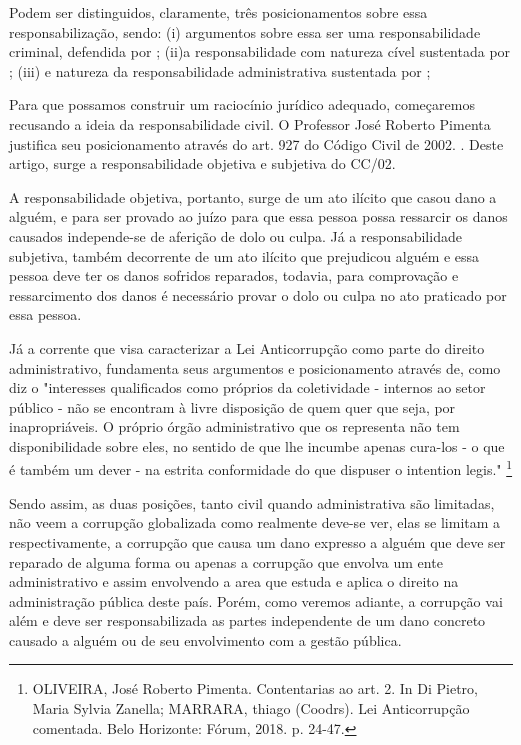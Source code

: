 Podem ser distinguidos, claramente, três posicionamentos sobre essa responsabilização, sendo: (i) argumentos sobre essa ser uma responsabilidade criminal, defendida por \cite{modestocarvalhosa}; (ii)a responsabilidade com natureza cível sustentada por \cite{JosePimenta}; (iii) e natureza da responsabilidade administrativa sustentada por \cite{MariaSylvia};  

Para que possamos construir um raciocínio jurídico adequado, começaremos recusando a ideia da responsabilidade civil. O Professor José Roberto Pimenta justifica seu posicionamento através do art. 927 do Código Civil de 2002. \cite[Art. 927: aquele que, por ato ilícito, causar dano a outrem, fica obrigado a repara-lo]{Codigocivil}. Deste artigo, surge a responsabilidade objetiva e subjetiva do CC/02. 

A responsabilidade objetiva, portanto, surge de um ato ilícito que casou dano a alguém, e para ser provado ao juízo para que essa pessoa possa ressarcir os danos causados independe-se de aferição de dolo ou culpa. Já a responsabilidade subjetiva, também decorrente de um ato ilícito que prejudicou alguém e essa pessoa deve ter os danos sofridos reparados, todavia, para comprovação e ressarcimento dos danos é necessário provar o dolo ou culpa no ato praticado por essa pessoa. 

Já a corrente que visa caracterizar a Lei Anticorrupção como parte do direito administrativo, fundamenta seus argumentos e posicionamento através de, como diz \cite{MariaSylvia} o "interesses qualificados como próprios da coletividade - internos ao setor público - não se encontram à livre disposição de quem quer que seja, por inapropriáveis. O próprio órgão administrativo que os representa não tem disponibilidade sobre eles, no sentido de que lhe incumbe apenas cura-los - o que é também um dever - na estrita conformidade do que dispuser o intention legis." \footnote{OLIVEIRA, José Roberto Pimenta. Contentarias ao art. 2. In Di Pietro, Maria Sylvia Zanella; MARRARA, thiago (Coodrs). Lei Anticorrupção comentada. Belo Horizonte: Fórum, 2018. p. 24-47.}

Sendo assim, as duas posições, tanto civil quando administrativa são limitadas, não veem a corrupção globalizada como realmente deve-se ver, elas se limitam a respectivamente, a corrupção que causa um dano expresso a alguém que deve ser reparado de alguma forma ou apenas a corrupção que envolva um ente administrativo e assim envolvendo a area que estuda e aplica o direito na administração pública deste país. Porém, como veremos adiante, a corrupção vai além e deve ser responsabilizada as partes independente de um dano concreto causado a alguém ou de seu envolvimento com a gestão pública. 


